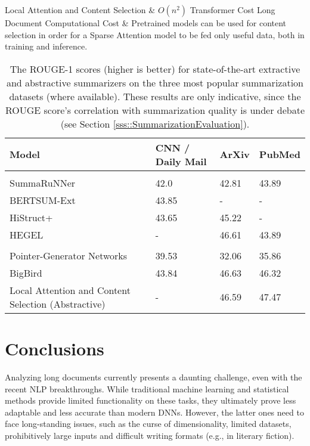 \documentclass[preprint,review,10pt]{elsarticle}
\begin{document}
\begin{table}
\begin{tabular}
			\hline
			Local Attention and Content Selection \cite{gales} & $O(n^2)$ Transformer Cost  \break\break Long Document Computational Cost & Pretrained models can be used for content selection in order for a Sparse Attention model to be fed only useful data, both in training and inference.\\ 
			\hline
		\end{tabular}
		\caption{Issues and solutions for long document summarization.}
		\label{tab::text_sum_table}
	\end{table}
	
	\begin{table}
		\begin{tabular}
			{ |p{5cm}|p{3cm}|p{3cm}|p{3cm}|  }
			\hline
			\cellcolor{blue!25}\textbf{Model} & \cellcolor{blue!25}\textbf{CNN / Daily Mail} & \cellcolor{blue!25}\textbf{ArXiv} &
			\cellcolor{blue!25}\textbf{PubMed}\\
			\hline
			\rowcolor{lightgray} 
			\multicolumn{4}{|c|}{Extractive Document Summarization} \\
			\hline
			SummaRuNNer \cite{nallapati} & 42.0 & 42.81 & 43.89\\
			\hline
			BERTSUM-Ext \cite{nallapati2} & 43.85 & - & - \\  
			\hline
			HiStruct+ \cite{histruct} & 43.65 & 45.22 & - \\
			\hline
			HEGEL \cite{hegel} & - & 46.61 & 43.89\\
			\hline
			\rowcolor{lightgray}
			\multicolumn{4}{|c|}{Abstractive Document Summarization} \\
			\hline
			Pointer-Generator Networks \cite{abigail} & 39.53 & 32.06 & 35.86 \\
			\hline
			BigBird \cite{big_bird} & 43.84 & 46.63 & 46.32 \\
			\hline
			Local Attention and Content Selection (Abstractive) \cite{gales} & - & 46.59 & 47.47\\ 
			\hline
		\end{tabular}
		\caption{The ROUGE-1 scores (higher is better) for state-of-the-art extractive and abstractive summarizers on the three most popular summarization datasets (where available). These results are only indicative, since the ROUGE score's correlation with summarization quality is under debate (see Section \ref{sss::SummarizationEvaluation}).}
		\label{tab::ResultsSummarization}
	\end{table}
	
	
	\section{Conclusions}
	\label{sec::Conclusions}
	Analyzing long documents currently presents a daunting challenge, even with the recent NLP breakthroughs. While traditional machine learning and statistical methods provide limited functionality on these tasks, they ultimately prove less adaptable and less accurate than modern DNNs. However, the latter ones need to face long-standing issues, such as the curse of dimensionality, limited datasets, prohibitively large inputs and difficult writing formats (e.g., in literary fiction).
	
\end{document}
